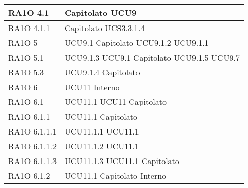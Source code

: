 \begin{center}
\begin{longtable}{ | p{5cm} | p{5cm} |}
        RA1O 4.1  &  Capitolato \newline  UCU9 \newline  \\ \hline      
        RA1O 4.1.1  &  Capitolato \newline  UCS3.3.1.4 \newline  \\ \hline      
        RA1O 5  &  UCU9.1 \newline  Capitolato \newline  UCU9.1.2 \newline  UCU9.1.1 \newline  \\ \hline      
        RA1O 5.1 &  UCU9.1.3 \newline  UCU9.1 \newline  Capitolato \newline  UCU9.1.5 \newline  UCU9.7 \newline  \\ \hline      
        RA1O 5.3 &  UCU9.1.4 \newline  Capitolato \newline  \\ \hline      
        RA1O 6 &  UCU11 \newline  Interno \newline  \\ \hline      
        RA1O 6.1  &  UCU11.1 \newline  UCU11 \newline  Capitolato \newline  \\ \hline      
        RA1O 6.1.1  &  UCU11.1 \newline  Capitolato \newline  \\ \hline      
        RA1O 6.1.1.1  &  UCU11.1.1 \newline  UCU11.1 \newline  \\ \hline      
        RA1O 6.1.1.2 &  UCU11.1.2 \newline  UCU11.1 \newline  \\ \hline      
        RA1O 6.1.1.3  &  UCU11.1.3 \newline  UCU11.1 \newline  Capitolato \newline  \\ \hline      
        RA1O 6.1.2  &  UCU11.1 \newline  Capitolato \newline  Interno \newline  \\ \hline      

\end{longtable}
\end{center}
